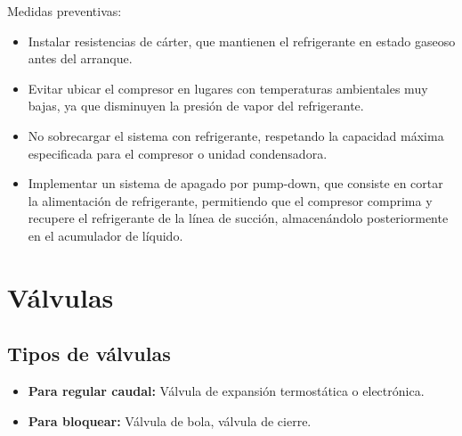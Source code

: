 Medidas preventivas:
\begin{itemize}
    \item Instalar resistencias de cárter, que mantienen el refrigerante en estado gaseoso antes del arranque.
    \item Evitar ubicar el compresor en lugares con temperaturas ambientales muy bajas, ya que disminuyen la presión de vapor del refrigerante.
    \item No sobrecargar el sistema con refrigerante, respetando la capacidad máxima especificada para el compresor o unidad condensadora.
    \item Implementar un sistema de apagado por pump-down, que consiste en cortar la alimentación de refrigerante, permitiendo que el compresor comprima y recupere el refrigerante de la línea de succión, almacenándolo posteriormente en el acumulador de líquido.
\end{itemize}

\section{Válvulas}


\subsection{Tipos de válvulas}
\begin{itemize}
\item \textbf{Para regular caudal:} Válvula de expansión termostática o electrónica.
\item \textbf{Para bloquear:} Válvula de bola, válvula de cierre.
\end{itemize}

